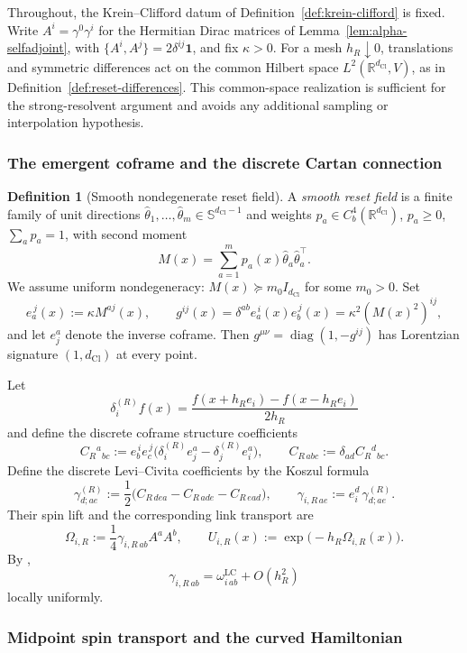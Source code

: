\documentclass[11pt]{article}
\theoremstyle{definition}
\newtheorem{definition}[theorem]{Definition}
\theoremstyle{remark}
\newcommand{\R}{\mathbb{R}}
\newcommand{\dCl}{d_{\mathrm{Cl}}}
\newcommand{\Sphere}{\mathbb{S}}
\newcommand{\one}{\mathbf{1}}
\newcommand{\diag}{\operatorname{diag}}
\begin{document}
Throughout, the Krein--Clifford datum of
Definition~\ref{def:krein-clifford} is fixed.  Write
\(A^i=\gamma^0\gamma^i\) for the Hermitian Dirac matrices of
Lemma~\ref{lem:alpha-selfadjoint}, with
\(\{A^i,A^j\}=2\delta^{ij}\one\), and fix \(\kappa>0\).
For a mesh \(h_R\downarrow0\), translations and symmetric differences act on
the common Hilbert space \(L^2(\R^{\dCl},V)\), as in
Definition~\ref{def:reset-differences}.  This common-space realization is
sufficient for the strong-resolvent argument and avoids any additional
sampling or interpolation hypothesis.

\subsubsection{The emergent coframe and the discrete Cartan connection}

\begin{definition}[Smooth nondegenerate reset field]
\label{def:reset-field}
A \emph{smooth reset field} is a finite family of unit directions
\(\hat\theta_1,\ldots,\hat\theta_m\in\Sphere^{\dCl-1}\) and weights
\(p_a\in C_b^4(\R^{\dCl})\), \(p_a\ge0\), \(\sum_a p_a=1\), with second moment
\[
  M(x)=\sum_{a=1}^m p_a(x)\hat\theta_a\hat\theta_a^\top .
\]
We assume uniform nondegeneracy: \(M(x)\succeq m_0I_{\dCl}\) for some \(m_0>0\).
Set
\[
  e_a^{\,j}(x):=\kappa M^{aj}(x),\qquad
  g^{ij}(x)=\delta^{ab}e_a^{\,i}(x)e_b^{\,j}(x)
           =\kappa^2(M(x)^2)^{ij},
\]
and let \(e^a_j\) denote the inverse coframe.  Then
\(g^{\mu\nu}=\diag(1,-g^{ij})\) has Lorentzian signature
\((1,\dCl)\) at every point.
\end{definition}

Let
\[
  \delta_i^{(R)}f(x)
  =\frac{f(x+h_Re_i)-f(x-h_Re_i)}{2h_R}
\]
and define the discrete coframe structure coefficients
\[
  C_R{}^a{}_{bc}
  :=e_b^{\,i}e_c^{\,j}
    \bigl(\delta_i^{(R)}e^a_j-\delta_j^{(R)}e^a_i\bigr),
  \qquad C_{R\,abc}:=\delta_{ad}C_R{}^d{}_{bc}.
\]
Define the discrete Levi--Civita coefficients by the Koszul formula
\[
  \gamma_{d;ae}^{(R)}
  :=
  \frac12\bigl(
    C_{R\,dea}-C_{R\,ade}-C_{R\,ead}
  \bigr),
  \qquad
  \gamma_{i,R\,ae}
  :=
  e^d_i\,\gamma_{d;ae}^{(R)} .
\]
Their spin lift and the corresponding link transport are
\[
  \Omega_{i,R}
  :=
  \frac14\gamma_{i,R\,ab}A^aA^b,
  \qquad
  U_{i,R}(x)
  :=
  \exp\!\bigl(-h_R\Omega_{i,R}(x)\bigr).
\]
By ,
\[
  \gamma_{i,R\,ab}
  =
  \omega^{\mathrm{LC}}_{i\,ab}+O(h_R^2)
\]
locally uniformly.

\subsubsection{Midpoint spin transport and the curved Hamiltonian}
\end{document}
